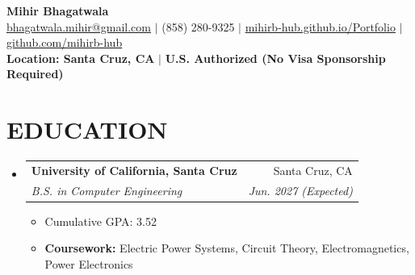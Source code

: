 \documentclass[letterpaper,11pt]{article}
\makeatletter
\newcommand{\resumeItem}[1]{
  \item\small{
    {#1 \vspace{-2pt}}
  }
}
\newcommand{\resumeSubheading}[4]{
  \vspace{-2pt}\item
    \begin{tabular*}{0.97\textwidth}[t]{l@{\extracolsep{\fill}}r}
      \textbf{#1} & #2 \\
      \textit{\small#3} & \textit{\small #4} \\
    \end{tabular*}\vspace{-7pt}
}
\newcommand{\resumeSubHeadingListStart}{\begin{itemize}[leftmargin=0.15in, label={}]}
\newcommand{\resumeSubHeadingListEnd}{\end{itemize}}
\newcommand{\resumeItemListStart}{\begin{itemize}}
\newcommand{\resumeItemListEnd}{\end{itemize}\vspace{-5pt}}
\makeatother
\begin{document}

\begin{center}
    \textbf{\Huge Mihir Bhagatwala} \\ \vspace{5pt}
    \small \href{mailto:bhagatwala.mihir@gmail.com}{bhagatwala.mihir@gmail.com} $|$ (858) 280-9325 $|$ \href{https://mihirb-hub.github.io/Portfolio/}{mihirb-hub.github.io/Portfolio} $|$ \href{https://github.com/mihirb-hub}{github.com/mihirb-hub} \\ \vspace{2pt}
    \textbf{Location: Santa Cruz, CA} $|$ \textbf{U.S. Authorized (No Visa Sponsorship Required)}
\end{center}


\section{EDUCATION}
  \resumeSubHeadingListStart
    \resumeSubheading
      {University of California, Santa Cruz}{Santa Cruz, CA}
      {B.S. in Computer Engineering}{Jun. 2027 (Expected)}
      \resumeItemListStart
        \resumeItem{Cumulative GPA: 3.52}
        \resumeItem{\textbf{Coursework:} Electric Power Systems, Circuit Theory, Electromagnetics, Power Electronics}
      \resumeItemListEnd
  \resumeSubHeadingListEnd


\end{document}
